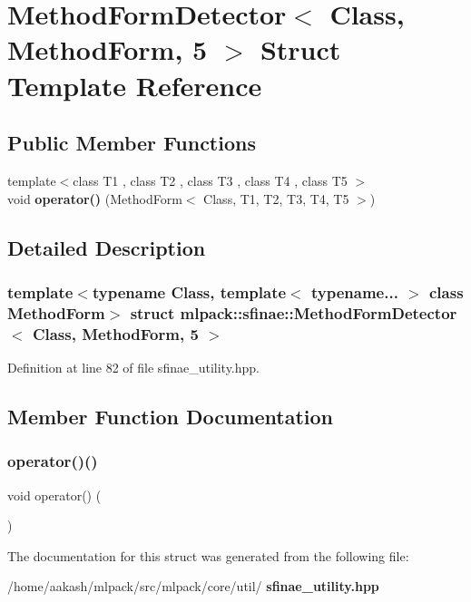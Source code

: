 \section{Method\+Form\+Detector$<$ Class, Method\+Form, 5 $>$ Struct Template Reference}
\label{structmlpack_1_1sfinae_1_1MethodFormDetector_3_01Class_00_01MethodForm_00_015_01_4}
\subsection*{Public Member Functions}
\begin{DoxyCompactItemize}
\item 
{\footnotesize template$<$class T1 , class T2 , class T3 , class T4 , class T5 $>$ }\\void \textbf{ operator()} (Method\+Form$<$ Class, T1, T2, T3, T4, T5 $>$)
\end{DoxyCompactItemize}


\subsection{Detailed Description}
\subsubsection*{template$<$typename Class, template$<$ typename... $>$ class Method\+Form$>$\newline
struct mlpack\+::sfinae\+::\+Method\+Form\+Detector$<$ Class, Method\+Form, 5 $>$}



Definition at line 82 of file sfinae\+\_\+utility.\+hpp.



\subsection{Member Function Documentation}
\mbox{\label{structmlpack_1_1sfinae_1_1MethodFormDetector_3_01Class_00_01MethodForm_00_015_01_4_aa3ade3d3c14de7d9139c73f66fda405f}} 
\subsubsection{operator()()}
{\footnotesize\ttfamily void operator() (\begin{DoxyParamCaption}\item[{Method\+Form$<$ Class, T1, T2, T3, T4, T5 $>$}]{ }\end{DoxyParamCaption})}



The documentation for this struct was generated from the following file\+:\begin{DoxyCompactItemize}
\item 
/home/aakash/mlpack/src/mlpack/core/util/\textbf{ sfinae\+\_\+utility.\+hpp}\end{DoxyCompactItemize}
